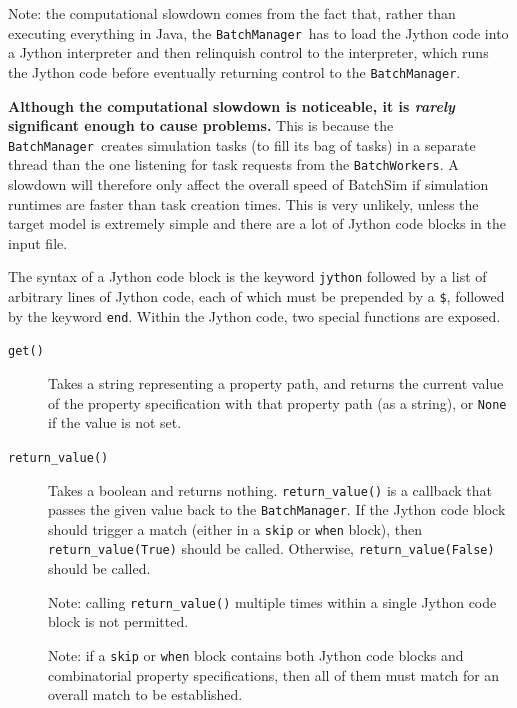 \documentclass{article}
\newcommand{\BM}{{\tt BatchManager}}
\newcommand{\BWs}{{\tt BatchWorkers}}
\begin{document}
\begin{sideblock}
Note: the computational slowdown comes from the fact that, rather than executing everything in Java, the \BM\ has to load the Jython code into a Jython interpreter and then relinquish control to the interpreter, which runs the Jython code before eventually returning control to the \BM.

\textbf{Although the computational slowdown is noticeable, it is \textit{rarely} significant enough to cause problems.} This is because the \BM\ creates simulation tasks (to fill its bag of tasks) in a separate thread than the one listening for task requests from the \BWs. A slowdown will therefore only affect the overall speed of BatchSim if simulation runtimes are faster than task creation times. This is very unlikely, unless the target model is extremely simple and there are a lot of Jython code blocks in the input file.
\end{sideblock}

The syntax of a Jython code block is the keyword {\tt jython} followed by a list of arbitrary lines of Jython code, each of which must be prepended by a {\tt \$}, followed by the keyword {\tt end}. Within the Jython code, two special functions are exposed.

\begin{description}

\item[{\tt get()} ] \mbox{}

Takes a string representing a property path, and returns the current value of the property specification with that property path (as a string), or {\tt None} if the value is not set.

\item[{\tt return\_value()} ] \mbox{}

Takes a boolean and returns nothing. {\tt return\_value()} is a callback that passes the given value back to the \BM. If the Jython code block should trigger a match (either in a {\tt skip} or {\tt when} block), then {\tt return\_value(True)} should be called. Otherwise, {\tt return\_value(False)} should be called.

\begin{sideblock}
Note: calling {\tt return\_value()} multiple times within a single Jython code block is not permitted.
\end{sideblock}

\begin{sideblock}
Note: if a {\tt skip} or {\tt when} block contains both Jython code blocks and combinatorial property specifications, then all of them must match for an overall match to be established.
\end{sideblock}

\end{description}
\end{document}
